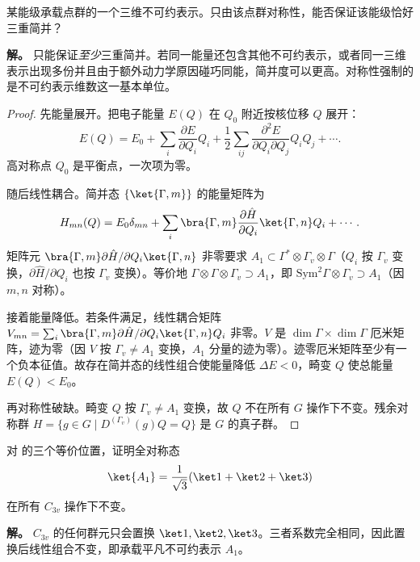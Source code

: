 \begin{workedexample}
某能级承载点群的一个三维不可约表示。只由该点群对称性，能否保证该能级恰好三重简并？

\textbf{解。} 只能保证\emph{至少}三重简并。若同一能量还包含其他不可约表示，或者同一三维表示出现多份并且由于额外动力学原因碰巧同能，简并度可以更高。对称性强制的是不可约表示维数这一基本单位。
\end{workedexample}


\begin{proof}
先能量展开。把电子能量 $E(Q)$ 在 $Q_0$ 附近按核位移 $Q$ 展开：
\[
E(Q)=E_0+\sum_i\frac{\partial E}{\partial Q_i}Q_i+\frac12\sum_{ij}\frac{\partial^2E}{\partial Q_i\partial Q_j}Q_iQ_j+\cdots.
\]
高对称点 $Q_0$ 是平衡点，一次项为零。

随后线性耦合。简并态 $\{\ket{\Gamma,m}\}$ 的能量矩阵为
\[
H_{mn}(Q)=E_0\delta_{mn}+\sum_i\bra{\Gamma,m}\frac{\partial\hat H}{\partial Q_i}\ket{\Gamma,n}Q_i+\cdots.
\]
矩阵元 $\bra{\Gamma,m}\partial\hat H/\partial Q_i\ket{\Gamma,n}$ 非零要求 $A_1\subset\Gamma^*\otimes\Gamma_v\otimes\Gamma$（$Q_i$ 按 $\Gamma_v$ 变换，$\partial\hat H/\partial Q_i$ 也按 $\Gamma_v$ 变换）。等价地 $\Gamma\otimes\Gamma\otimes\Gamma_v\supset A_1$，即 $\mathrm{Sym}^2\Gamma\otimes\Gamma_v\supset A_1$（因 $m,n$ 对称）。

接着能量降低。若条件满足，线性耦合矩阵 $V_{mn}=\sum_i\bra{\Gamma,m}\partial\hat H/\partial Q_i\ket{\Gamma,n}Q_i$ 非零。$V$ 是 $\dim\Gamma\times\dim\Gamma$ 厄米矩阵，迹为零（因 $V$ 按 $\Gamma_v\ne A_1$ 变换，$A_1$ 分量的迹为零）。迹零厄米矩阵至少有一个负本征值。故存在简并态的线性组合使能量降低 $\Delta E<0$，畸变 $Q$ 使总能量 $E(Q)<E_0$。

再对称性破缺。畸变 $Q$ 按 $\Gamma_v\ne A_1$ 变换，故 $Q$ 不在所有 $G$ 操作下不变。残余对称群 $H=\{g\in G\mid D^{(\Gamma_v)}(g)Q=Q\}$ 是 $G$ 的真子群。
\end{proof}

\begin{workedexample}
对 的三个等价位置，证明全对称态
\[
\ket{A_1}=\frac1{\sqrt3}(\ket1+\ket2+\ket3)
\]
在所有 $C_{3v}$ 操作下不变。

\textbf{解。} $C_{3v}$ 的任何群元只会置换 $\ket1,\ket2,\ket3$。三者系数完全相同，因此置换后线性组合不变，即承载平凡不可约表示 $A_1$。
\end{workedexample}


